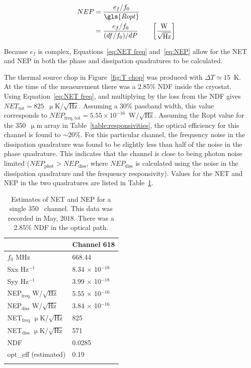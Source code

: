 \begin{equation}\label{eq:NEP}
  \begin{aligned}
  NEP &= \frac{e_{f}/f_{0}}{\gls{Ropt}} \\
      &=  \frac{e_{f}/f_{0}}{(df/f_{0})/dP} \qquad \left[ \frac{\mathrm{W}}{ \sqrt{\mathrm{Hz}} } \right]
  \end{aligned}
\end{equation}

Because $e_{f}$ is complex, Equations~\ref{eq:NET freq} and~\ref{eq:NEP} allow for the NET and NEP in both the phase and dissipation quadratures to be calculated.

The thermal source chop in Figure~\ref{fig:T chop} was produced with $\Delta T \simeq 15$~K. At the time of the measurement there was a 2.85\% NDF inside the cryostat. Using Equation~\ref{eq:NET freq}, and multiplying by the loss from the NDF gives $NET_{\mathrm{tot}} = 825$~$\upmu$K/$\sqrt{\mathrm{Hz}}$. Assuming a 30\% passband width, this value corresponds to $NEP_{\mathrm{freq,tot}} = 5.55 \times 10^{-16}$~W/$\sqrt{\mathrm{Hz}}$. Assuming the \gls{Ropt} value for the 350~$\upmu$m array in Table~\ref{table:responsivities}, the optical efficiency for this channel is found to $\sim$20\%. For this particular channel, the frequency noise in the dissipation quadrature was found to be slightly less than half of the noise in the phase quadrature. This indicates that the channel is close to being photon noise limited ($NEP_{\mathrm{phot}} > NEP_{\mathrm{diss}}$, where $NEP_{\mathrm{diss}}$ is calculated using the noise in the dissipation quadrature and the frequency responsivity). Values for the NET and NEP in the two quadratures are listed in Table~\ref{table:NET NEP example}.


\begin{table}[!htbp]
\centering
\caption[~Single detector NET and NEP estimated from a thermal chop.]{Estimates of NET and NEP for a single 350~ channel. This data was recorded in May, 2018. There was a 2.85\% NDF in the optical path.}
\label{table:NET NEP example}
\begin{tabular}{@{}ll@{}}
\dtoprule{}
 & Channel 618 \\ \midrule
$f_{0}$ MHz & 668.44 \\
\gls{Sxx} Hz$^{-1}$ & 8.34 $\times$ 10$^{-18}$ \\
\gls{Syy} Hz$^{-1}$ & 3.99 $\times$ 10$^{-18}$ \\
NEP$_{\mathrm{freq}}$ W/$\sqrt{\mathrm{Hz}}$ & 5.55 $\times$ 10$^{-16}$ \\
NEP$_{\mathrm{diss}}$ W/$\sqrt{\mathrm{Hz}}$ & 3.84 $\times$ 10$^{-16}$ \\
NET$_{\mathrm{freq}}$ $\upmu$K/$\sqrt{\mathrm{Hz}}$ & 825 \\
NET$_{\mathrm{diss}}$ $\upmu$K/$\sqrt{\mathrm{Hz}}$ & 571 \\
NDF & 0.0285 \\
\gls{opt_eff} (estimated) & 0.19 \\ \dbottomrule{}
\\
\end{tabular}
\end{table}

